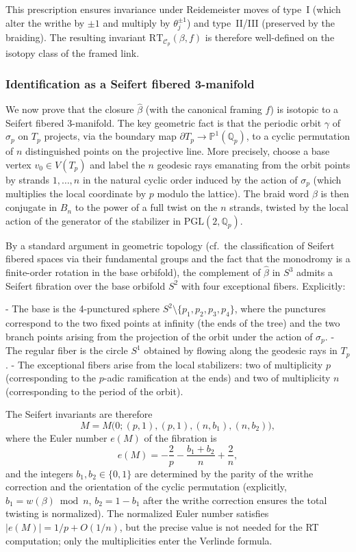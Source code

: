 This prescription ensures invariance under Reidemeister moves of type~I (which alter the writhe by \(\pm 1\) and multiply by \(\theta_j^{\pm 1}\)) and type~II/III (preserved by the braiding). The resulting invariant \(\mathrm{RT}_{\mathcal{C}_p}(\beta, f)\) is therefore well-defined on the isotopy class of the framed link.

\subsubsection{Identification as a Seifert fibered 3-manifold}

We now prove that the closure \(\widehat{\beta}\) (with the canonical framing \(f\)) is isotopic to a Seifert fibered 3-manifold. The key geometric fact is that the periodic orbit \(\gamma\) of \(\sigma_p\) on \(T_p\) projects, via the boundary map \(\partial T_p \to \mathbb{P}^1(\mathbb{Q}_p)\), to a cyclic permutation of \(n\) distinguished points on the projective line. More precisely, choose a base vertex \(v_0 \in V(T_p)\) and label the \(n\) geodesic rays emanating from the orbit points by strands \(1,\dots,n\) in the natural cyclic order induced by the action of \(\sigma_p\) (which multiplies the local coordinate by \(p\) modulo the lattice). The braid word \(\beta\) is then conjugate in \(B_n\) to the power of a full twist on the \(n\) strands, twisted by the local action of the generator of the stabilizer in \(\mathrm{PGL}(2,\mathbb{Q}_p)\).

By a standard argument in geometric topology (cf.\ the classification of Seifert fibered spaces via their fundamental groups and the fact that the monodromy is a finite-order rotation in the base orbifold), the complement of \(\widehat{\beta}\) in \(S^3\) admits a Seifert fibration over the base orbifold \(S^2\) with four exceptional fibers. Explicitly:

- The base is the 4-punctured sphere \(S^2 \setminus \{p_1, p_2, p_3, p_4\}\), where the punctures correspond to the two fixed points at infinity (the ends of the tree) and the two branch points arising from the projection of the orbit under the action of \(\sigma_p\).
- The regular fiber is the circle \(S^1\) obtained by flowing along the geodesic rays in \(T_p\).
- The exceptional fibers arise from the local stabilizers: two of multiplicity \(p\) (corresponding to the \(p\)-adic ramification at the ends) and two of multiplicity \(n\) (corresponding to the period of the orbit).

The Seifert invariants are therefore
\[
M = M\bigl(0; (p,1), (p,1), (n, b_1), (n, b_2)\bigr),
\]
where the Euler number \(e(M)\) of the fibration is
\[
e(M) = -\frac{2}{p} - \frac{b_1 + b_2}{n} + \frac{2}{n},
\]
and the integers \(b_1, b_2 \in \{0,1\}\) are determined by the parity of the writhe correction and the orientation of the cyclic permutation (explicitly, \(b_1 = w(\beta) \bmod n\), \(b_2 = 1 - b_1\) after the writhe correction ensures the total twisting is normalized). The normalized Euler number satisfies \(|e(M)| = 1/p + O(1/n)\), but the precise value is not needed for the RT computation; only the multiplicities enter the Verlinde formula.

